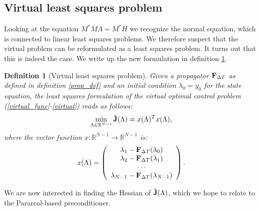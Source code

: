 \documentclass[11pt,a4paper]{article}
\newtheorem{definition}{Definition}
\begin{document}
\subsection{Virtual least squares problem}
Looking at the equation $M^*M\Lambda =M^*H$ we recognize the normal equation, which is connected to linear least squares problems. We therefore suspect that the virtual problem can be reformulated as a least squares problem. It turns out that this is indeed the case. We write up the new formulation in definition \ref{VLSPD}.
\begin{definition}[Virtual least squares problem] \label{VLSPD}
Given a propagator $\bold F_{\Delta T}$ as defined in definition \ref{prop_def} and an initial condition $\lambda_0=y_0$ for the state equation, the least squares formulation of the virtual optimal control problem (\ref{virtual_func}-\ref{virtual}) reads as follows:
\begin{align}
\min_{\Lambda\in\mathbb{R}^{N-1}}\hat{\bold J}(\Lambda) = x(\Lambda)^Tx(\Lambda), \label{non_lin_LS}
\end{align}
where the vector function $x:\mathbb{R}^{N-1}\rightarrow \mathbb{R}^{N-1}$ is:
\begin{align}
x(\Lambda)= \left( \begin{array}{c}  
   \lambda_1 - \bold F_{\Delta T}(\lambda_0) \\ 
   \lambda_2 - \bold F_{\Delta T}(\lambda_1) \\
   \cdots  \\
   \lambda_{N-1} -\bold F_{\Delta T}(\lambda_{N-1}) \\
   \end{array}  \right).
\end{align}
\end{definition}
We are now interested in finding the Hessian of $\hat{\bold J}(\Lambda)$, which we hope to relate to the Parareal-based preconditioner. 
\end{document}
